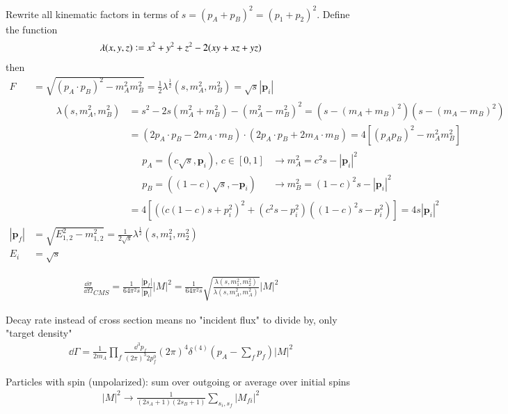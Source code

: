 Rewrite all kinematic factors in terms of $s=(p_A+p_B)^2=(p_1+p_2)^2$. Define the function
\begin{align}
	\lambda(x,y,z) \vcentcolon = x^2 + y^2 +z^2 -2(xy + xz + yz)
\end{align}
then
\begin{align*}
	F &= \sqrt{(p_A\cdot p_B)^2 - m_A^2 m_B^2} = \frac{1}{2} \lambda^{\frac{1}{2}}(s,m^2_A,m^2_B) = \sqrt{s} |\pmb{p}_i| \\
	  &\qquad \boxed{ \begin{array}{ll}
			  \lambda (s,m_A^2, m_B^2) &= s^2 -2s(m_A^2 + m_B^2)-(m_A^2 - m_B^2)^2 =  (s - (m_A + m_B)^2)(s - (m_A - m_B)^2) \\
									   &= (2p_A \cdot p_B -2 m_A\cdot m_B) \cdot (2p_A \cdot p_B + 2 m_A\cdot m_B) = 4 \left[ (p_A p_B)^2 - m_A^2 m_B^2 \right]  \\
									   &\quad \boxed{ 
					   \begin{array}{ll}
						   p_A = (c\sqrt{s}, \pmb{p}_i),\, c \in [0,1] &\rightarrow m^2_A = c^2s - |\pmb{p}_i|^2 \\
						   p_B = ((1-c)\sqrt{s}, -\pmb{p}_i) &\rightarrow m^2_B = (1-c)^2 s - |\pmb{p}_i|^2
						\end{array}
					} \\
									   & =4 \left[ \left((c(1-c)s + p_i^2 \right)^2 + (c^2s - p_i^2)((1-c)^2s - p_i^2)\right] = 4 s |\pmb{p}_i|^2
	  \end{array} } \\
	|\pmb{p}_f| &= \sqrt{E^2_{1,2} - m_{1,2}^2} = \frac{1}{2\sqrt{s}} \lambda^{\frac{1}{2}}(s, m_1^2, m_2^2) \\
	E_i & = \sqrt{s}
\end{align*}

\begin{align}
	\frac{\dd \sigma}{\dd \Omega}_{CMS} = \frac{1}{64 \pi^2 s} \frac{|\pmb{p}_f|}{|\pmb{p}_i|}|M|^2 = \frac{1}{64\pi^2 s} \sqrt{\frac{\lambda(s, m_1^2, m_2^2)}{\lambda(s, m_A^2, m_A^2)}} |M|^2
\end{align}

Decay rate instead of cross section means no "incident flux" to divide by, only "target density"
\begin{align}
	\dd \Gamma = \frac{1}{2m_A} \prod_f \frac{\dd^3 p_f}{(2\pi)^3 2p_f^0} (2\pi)^4 \delta^{(4)}(p_A - \sum_f p_f) |M|^2
\end{align}

Particles with spin (unpolarized): sum over outgoing or average over initial spins
\begin{align}
	|M|^2 \rightarrow \frac{1}{(2s_A + 1)(2s_B + 1)} \sum_{s_i, s_f} |M_{fi}|^2
\end{align}

